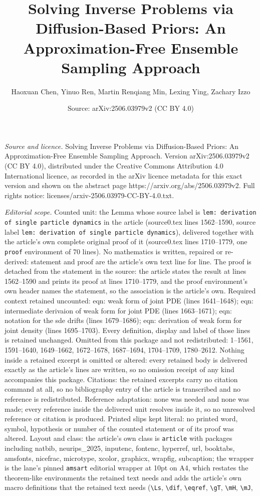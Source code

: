 \documentclass[10pt,a4paper]{amsart}
\title[Solving Inverse Problems via Diffusion-Based Priors: An Appr]{Solving Inverse Problems via Diffusion-Based Priors: An Approximation-Free Ensemble Sampling Approach}
\author{Haoxuan Chen, Yinuo Ren, Martin Renqiang Min, Lexing Ying, Zachary Izzo}
\date{Source: arXiv:2506.03979v2 (CC BY 4.0)}
\begin{document}
\maketitle

\noindent\emph{Source and licence.} Solving Inverse Problems via Diffusion-Based Priors: An Approximation-Free Ensemble Sampling Approach. Version arXiv:2506.03979v2 (CC BY 4.0), distributed under the Creative Commons Attribution 4.0 International licence, as recorded in the arXiv licence metadata for this exact version and shown on the abstract page https://arxiv.org/abs/2506.03979v2. Full rights notice: licenses/arxiv-2506.03979-CC-BY-4.0.txt.\par\smallskip

\noindent\textit{Editorial scope.} Counted unit: the Lemma whose source label is \texttt{lem: derivation of single particle dynamics} in the article (source0.tex lines 1562--1590, source label \texttt{lem: derivation of single particle dynamics}), delivered together with the article's own complete original proof of it (source0.tex lines 1710--1779, one \texttt{proof} environment of 70 lines). No mathematics is written, repaired or re-derived: statement and proof are the article's own text line for line. The proof is detached from the statement in the source: the article states the result at lines 1562--1590 and prints its proof at lines 1710--1779, and the proof environment's own header names the statement, so the association is the article's own. Required context retained uncounted: eqn: weak form of joint PDE (lines 1641--1648); eqn: intermediate derivaion of weak form for joint PDE (lines 1663--1671); eqn: notation for the sde drifts (lines 1679--1686); eqn: derivation of weak form for joint density (lines 1695--1703). Every definition, display and label of those lines is retained unchanged. Omitted from this package and not redistributed: 1--1561, 1591--1640, 1649--1662, 1672--1678, 1687--1694, 1704--1709, 1780--2612. Nothing inside a retained excerpt is omitted or altered: every retained body is delivered exactly as the article's lines are written, so no omission receipt of any kind accompanies this package. Citations: the retained excerpts carry no citation command at all, so no bibliography entry of the article is transcribed and no reference is redistributed. Reference adaptation: none was needed and none was made; every reference inside the delivered unit resolves inside it, so no unresolved reference or citation is produced. Printed slips kept literal: no printed word, symbol, hypothesis or number of the counted statement or of its proof was altered. Layout and class: the article's own class is \texttt{article} with packages including natbib, neurips\_2025, inputenc, fontenc, hyperref, url, booktabs, amsfonts, nicefrac, microtype, xcolor, graphicx, wrapfig, subcaption; the wrapper is the lane's pinned \texttt{amsart} editorial wrapper at 10pt on A4, which restates the theorem-like environments the retained text needs and adds the article's own macro definitions that the retained text needs (\texttt{\textbackslash Ls}, \texttt{\textbackslash dif}, \texttt{\textbackslash eqref}, \texttt{\textbackslash gT}, \texttt{\textbackslash mH}, \texttt{\textbackslash mJ}, 
\end{document}
